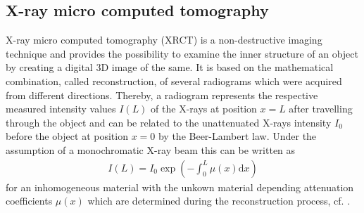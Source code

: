 \subsection{X-ray micro computed tomography}
X-ray micro computed tomography ({\textmu}XRCT) is a non-destructive imaging technique and provides the possibility to examine the inner structure of an object by creating a digital 3D image of the same. It is based on the mathematical combination, called reconstruction, of several radiograms which were acquired from different directions. Thereby, a radiogram represents the respective measured intensity values $I(L)$ of the X-rays at position $x = L$ after travelling through the object and can be related to the unattenuated X-rays intensity $I_0$ before the object at position $x = 0$ by the Beer-Lambert law. Under the assumption of a monochromatic X-ray beam this can be written as 
\begin{align*}
I(L) = I_0 \exp\left(-\int_0^L \mu(x) \mathrm{d}x \right)
\end{align*}
for an inhomogeneous material with the unkown material depending attenuation coefficients $\mu(x)$ which are determined during the reconstruction process, cf. \cite{Carmignato2018}.

